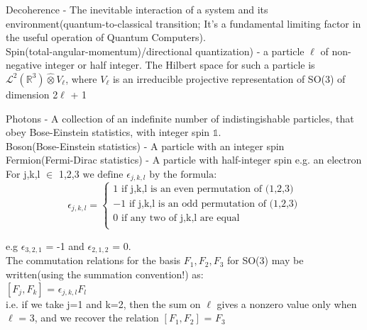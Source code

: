 \documentclass[a4paper, 10pt, onepage]{elegantbook}
\begin{document}
{Decoherence - The inevitable interaction of a system and its environment(quantum-to-classical transition; It's a fundamental limiting factor in the useful operation of Quantum Computers).  \\
                                                                         
Spin(total-angular-momentum)/directional quantization) - a particle $\ell$ of non-negative integer or half integer. The Hilbert space for such a particle is
$\mathscr L^2(\mathbb R^3) \hat \otimes V_{\ell}$, where $V_{\ell}$ is an irreducible projective representation of SO(3)
of dimension 2$\ell$ + 1

Photons - A collection of an indefinite number of indistingishable particles, that obey Bose-Einstein statistics, with integer spin $\mathbb 1$.  \\

Boson(Bose-Einstein statistics) - A particle with an integer spin  \\

Fermion(Fermi-Dirac statistics) - A particle with half-integer spin e.g. an electron  \\

For j,k,l $\in$ {1,2,3} $\text{we define}$ $\epsilon_{j,k,l}$ $\text{by the formula:}$  \\
\begin{equation}
\epsilon_{j,k,l} = \left\{
\begin{array}{ll}
   1 \text{ if {j,k,l} is an even permutation of (1,2,3)}  \\
  -1 \text{ if {j,k,l} is  an odd permutation of (1,2,3)}  \\
   0 \text{ if any two of {j,k,l} are equal}  \\
\end{array}
\right.
\end{equation}

e.g $\epsilon_{3,2,1}$ = -1 and $\epsilon _{2,1,2}$ = 0.  \\

The commutation relations for the basis ${F_1,F_2,F_3}$ for SO(3) may be written(using the summation convention!) as:  \\

$[F_j,F_k]$ = $\epsilon_{j,k,l}F_l$  \\

i.e. if we take j=1 and k=2, then the sum on $\ell$ gives a nonzero value only when $\ell$ = 3, and we recover the relation $[F_1,F_2]$ = $F_3$  \\

}
\end{document}
